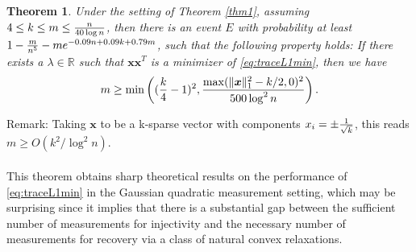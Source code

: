 \documentclass[11pt]{article}
\newtheorem{theorem}{Theorem}[section]
\newcommand{\<}{\langle}
\renewcommand{\>}{\rangle}
\newcommand{\vct}[1]{\bm{#1}}
\numberwithin{equation}{section}
\begin{document}
\begin{theorem}
\label{thm2}
Under the setting of Theorem \ref{thm1}, assuming $4 \leq k\leq m \leq {n\over{40\log n}}$, then there is an event $E$ with probability at least $1-{m\over{n^5}}-m e^{-0.09n+0.09k+0.79m}$, such that the following property holds: If there exists a $\lambda \in \mathbb{R}$ such that $\vct{x}\vct{x}^T$ is a minimizer of \eqref{eq:traceL1min}, then we have 
\[
m\geq  \min\left(({k\over 4}-1)^2, {{\max(\|\vct{x}\|_1^2-k/2, 0)^2}\over{500\log^2 n}}\right).
\]
\end{theorem}
Remark: Taking $\vct{x}$ to be a k-sparse vector with components $x_i=\pm{1\over{\sqrt{k}}}$, this reads $m\geq O
(k^2/\log^2 n)$.\\
\\
This theorem obtains sharp theoretical results on the performance of \eqref{eq:traceL1min} in the Gaussian quadratic measurement setting, which may be surprising since it implies that there is a substantial gap between the sufficient number of measurements for injectivity and the necessary number of measurements for recovery via a class of natural convex relaxations. \\
\end{document}
